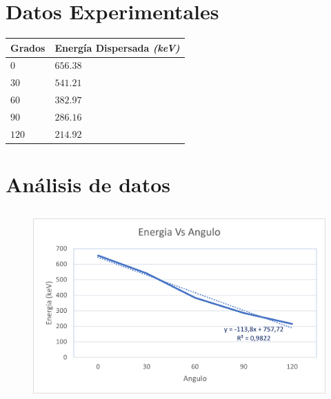 \documentclass[letterpaper, 12pt]{article}
\newcommand{\bolditalic}[1]{\textbf{\textit{#1}}}
\begin{document}
\section{Datos Experimentales}

\begin{table}[H]
      \begin{center}
            \begin{tabularx}{.5\linewidth}{|>{\centering\arraybackslash}X|>{\centering\arraybackslash}X|}
                  \hline
                  Grados & Energía Dispersada \bolditalic{(keV)} \\\hline
                  $0$    & $656.38$                              \\\hline
                  $30$   & $541.21$                              \\\hline
                  $60$   & $382.97$                              \\\hline
                  $90$   & $286.16$                              \\\hline
                  $120$  & $214.92$                              \\\hline

            \end{tabularx}
      \end{center}
\end{table}

\section{Análisis de datos}

\subsection{}

\begin{figure}[H]
      \begin{center}
            \includegraphics[width=.8\linewidth]{./Images/Graph.Analisis_1.png}
            \caption{}
      \end{center}
\end{figure}
\end{document}
